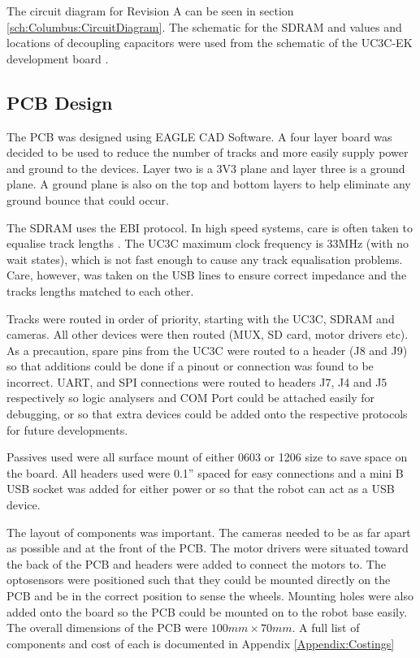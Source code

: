 The circuit diagram for Revision A can be seen in section \ref{sch:Columbus:CircuitDiagram}. The schematic for the SDRAM and values and locations of decoupling capacitors were used from the schematic of the UC3C-EK development board \citep{Atmel:UC3CEK}. 
\subsection{PCB Design}
The PCB was designed using EAGLE CAD Software. A four layer board was decided to be used to reduce the number of tracks and more easily supply power and ground to the devices. Layer two is a 3V3 plane and layer three is a ground plane. A ground plane is also on the top and bottom layers to help eliminate any ground bounce that could occur. 

The SDRAM uses the EBI protocol. In high speed systems, care is often taken to equalise track lengths \citep{liu2004equalization}. The UC3C maximum clock frequency is 33MHz (with no wait states), which is not fast enough to cause any track equalisation problems. Care, however, was taken on the USB lines to ensure correct impedance and the tracks lengths matched to each other.

Tracks were routed in order of priority, starting with the UC3C, SDRAM and cameras. All other devices were then routed (\itc MUX, SD card, motor drivers etc). As a precaution, spare pins from the UC3C were routed to a header (J8 and J9) so that additions could be done if a pinout or connection was found to be incorrect. UART, \itc and SPI connections were routed to headers J7, J4 and J5 respectively so logic analysers and COM Port could be attached easily for debugging, or so that extra devices could be added onto the respective protocols for future developments. 

Passives used were all surface mount of either 0603 or 1206 size to save space on the board. All headers used were 0.1'' spaced for easy connections and a mini B USB socket was added for either power or so that the robot can act as a USB device. 

The layout of components was important. The cameras needed to be as far apart as possible and at the front of the PCB. The motor drivers were situated toward the back of the PCB and headers were added to connect the motors to. The optosensors were positioned such that they could be mounted directly on the PCB and be in the correct position to sense the wheels. Mounting holes were also added onto the board so the PCB could be mounted on to the robot base easily. The overall dimensions of the PCB were $100mm \times 70mm$. A full list of components and cost of each is documented in Appendix \ref{Appendix:Costings}


